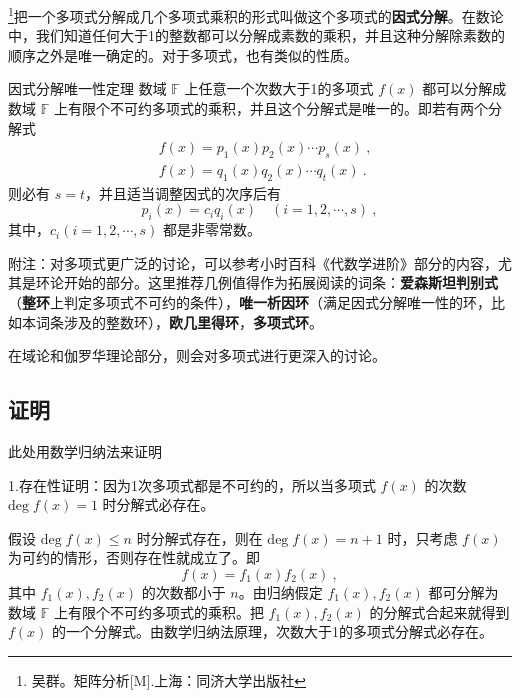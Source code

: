 
\footnote{吴群。矩阵分析[M].上海：同济大学出版社}把一个多项式分解成几个多项式乘积的形式叫做这个多项式的\textbf{因式分解}。在数论中，我们知道任何大于1的整数都可以分解成素数的乘积，并且这种分解除素数的顺序之外是唯一确定的。对于多项式，也有类似的性质。
\begin{theorem}{因式分解唯一性定理}
数域 $\mathbb{F}$ 上任意一个次数大于1的多项式 $f(x)$ 都可以分解成数域 $\mathbb{F}$ 上有限个不可约多项式的乘积，并且这个分解式是唯一的。即若有两个分解式
 \begin{equation}
 \begin{aligned}
 &f(x)=p_1(x)p_2(x)\cdots p_s(x)~,\\
 &f(x)=q_1(x)q_2(x)\cdots q_t(x)~.
 \end{aligned}
 \end{equation}
 则必有 $s=t$，并且适当调整因式的次序后有
 \begin{equation}
 p_i(x)=c_iq_i(x)\quad (i=1,2,\cdots,s)~,
 \end{equation}
 其中，$c_i(i=1,2,\cdots,s)$ 都是非零常数。
\end{theorem}


附注：对多项式更广泛的讨论，可以参考小时百科《代数学进阶》部分的内容，尤其是环论开始的部分。这里推荐几例值得作为拓展阅读的词条：\textbf{爱森斯坦判别式}（\textbf{整环}上判定多项式不可约的条件），\textbf{唯一析因环}（满足因式分解唯一性的环，比如本词条涉及的整数环），\textbf{欧几里得环}，\textbf{多项式环}。

在域论和伽罗华理论部分，则会对多项式进行更深入的讨论。


\subsection{证明}此处用数学归纳法来证明

1.存在性证明：因为1次多项式都是不可约的，所以当多项式 $f(x)$ 的次数 $\mathrm{deg}\;f(x)=1$ 时分解式必存在。

假设 $\mathrm{deg}\;f(x)\leq n$ 时分解式存在，则在 $\mathrm{deg}\;f(x)=n+1$ 时，只考虑 $f(x)$ 为可约的情形，否则存在性就成立了。即
\begin{equation}
f(x)=f_1(x)f_2(x)~,
\end{equation}
其中 $f_1(x),f_2(x)$ 的次数都小于 $n$。由归纳假定 $f_1(x),f_2(x)$ 都可分解为数域 $\mathbb{F}$ 上有限个不可约多项式的乘积。把 $f_1(x),f_2(x)$ 的分解式合起来就得到 $f(x)$ 的一个分解式。由数学归纳法原理，次数大于1的多项式分解式必存在。

